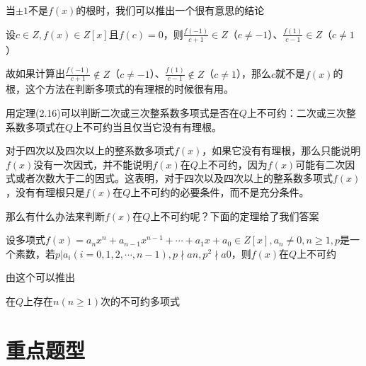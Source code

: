 \documentclass[lang=cn,10pt]{elegantbook}
\begin{document}
当$\pm1$不是$f(x)$的根时，我们可以推出一个很有意思的结论
\begin{conclusion}
	设$c\in Z,f(x)\in Z[x]$且$f(c)=0$，则$\frac{f(-1)}{c+1}\in Z$（$c\neq-1$）、$\frac{f(1)}{c-1}\in Z$（$c\neq1$）
\end{conclusion}
故如果计算出$\frac{f(-1)}{c+1}\notin Z$（$c\neq-1$）、$\frac{f(1)}{c-1}\notin Z$（$c\neq1$），那么$c$就不是$f(x)$的根，这个方法在判断多项式的有理根的时候很有用。

用定理(2.16)可以判断二次或三次整系数多项式是否在$Q$上不可约：二次或三次整系数多项式在$Q$上不可约当且仅当它没有有理根。

\begin{remark}
	
	对于四次以及四次以上的整系数多项式$f(x)$，如果它没有有理根，那么只能说明$f(x)$没有一次因式，并不能说明$f(x)$在$Q$上不可约，因为$f(x)$可能有二次因式或者次数大于二的因式。这表明，对于四次以及四次以上的整系数多项式$f(x)$，没有有理根只是$f(x)$在$Q$上不可约的必要条件，而不是充分条件。
\end{remark}

那么有什么办法来判断$f(x)$在$Q$上不可约呢？下面的定理给了我们答案
\begin{theorem}[Eisenstein判别法]
	设多项式$f(x)=a_nx^n+a_{n-1}x^{n-1}+\cdots+a_1x+a_0\in Z[x],a_{n}\ne0,n\ge1,p$是一个素数，若$p|a_i(i=0,1,2,\cdots,n-1),$$p\nmid an,p^{2}\nmid a0$，则$f(x)$在$Q$上不可约
\end{theorem}
由这个可以推出
\begin{theorem}
	在$Q$上存在$n(n\geq1)$次的不可约多项式
\end{theorem}
\section{重点题型}
\end{document}
